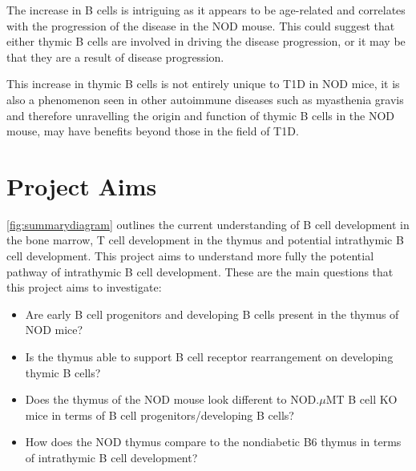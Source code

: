 
The increase in B cells is intriguing as it appears to be age-related and correlates with the progression of the disease in the NOD mouse.
This could suggest that either thymic B cells are involved in driving the disease progression, or it may be that they are a result of disease progression.

This increase in thymic B cells is not entirely unique to T1D in NOD mice, it is also a phenomenon seen in other autoimmune diseases such as myasthenia gravis \citep{Vrolix2014, Christensson1988} and therefore unravelling the origin and function of thymic B cells in the NOD mouse, may have benefits beyond those in the field of T1D.




\section{Project Aims}

\cref{fig:summarydiagram} outlines the current understanding of B cell development in the bone marrow, T cell development in the thymus and potential intrathymic B cell development.
This project aims to understand more fully the potential pathway of intrathymic B cell development.
These are the main questions that this project aims to investigate:
\begin{itemize}
\item Are early B cell progenitors and developing B cells present in the thymus of NOD mice?
\item Is the thymus able to support B cell receptor rearrangement on developing thymic B cells?
\item Does the thymus of the NOD mouse look different to NOD.$\mu$MT B cell KO mice in terms of B cell progenitors/developing B cells?
\item How does the NOD thymus compare to the nondiabetic B6 thymus in terms of intrathymic B cell development?
\end{itemize}

